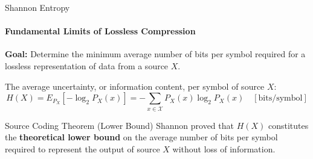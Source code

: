 \begin{frame}{Shannon Entropy}
    \framesubtitle{Fundamental Limits of Lossless Compression}

    \textbf{Goal:} Determine the minimum average number of bits per symbol required for a lossless representation of data from a source $X$.
    \pause %


    \begin{definition}
        The average uncertainty, or information content, per symbol of source $X$:
        \[ H(X) = E_{P_X}[-\log_2 P_X(x)] = -\sum_{x \in \mathcal{X}} P_X(x) \log_2 P_X(x) \quad [\text{bits/symbol}] \]
    \end{definition}
    \pause %

    \begin{alertblock}{Source Coding Theorem (Lower Bound)}
        Shannon proved that $H(X)$ constitutes the \textbf{theoretical lower bound} on the average number of bits per symbol required to represent the output of source $X$ without loss of information.
    \end{alertblock}


\end{frame}

